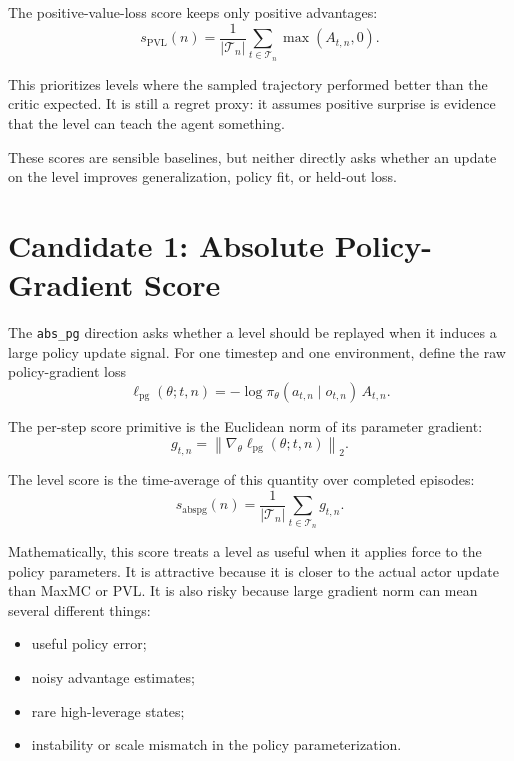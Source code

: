 \documentclass[11pt]{article}
\begin{document}
The positive-value-loss score keeps only positive advantages:
\begin{equation}
  s_{\mathrm{PVL}}(n)
    = \frac{1}{|\mathcal{T}_n|}
      \sum_{t \in \mathcal{T}_n}
      \max(A_{t,n}, 0).
\end{equation}

This prioritizes levels where the sampled trajectory performed better than the
critic expected. It is still a regret proxy: it assumes positive surprise is
evidence that the level can teach the agent something.

These scores are sensible baselines, but neither directly asks whether an
update on the level improves generalization, policy fit, or held-out loss.

\section{Candidate 1: Absolute Policy-Gradient Score}

The \texttt{abs\_pg} direction asks whether a level should be replayed when it induces
a large policy update signal. For one timestep and one environment, define the
raw policy-gradient loss
\begin{equation}
  \ell_{\mathrm{pg}}(\theta; t,n)
    = -\log \pi_\theta(a_{t,n} \mid o_{t,n})\, A_{t,n}.
\end{equation}

The per-step score primitive is the Euclidean norm of its parameter gradient:
\begin{equation}
  g_{t,n}
    = \left\lVert \nabla_\theta \ell_{\mathrm{pg}}(\theta; t,n) \right\rVert_2.
\end{equation}

The level score is the time-average of this quantity over completed episodes:
\begin{equation}
  s_{\mathrm{abspg}}(n)
    = \frac{1}{|\mathcal{T}_n|}
      \sum_{t \in \mathcal{T}_n} g_{t,n}.
\end{equation}

Mathematically, this score treats a level as useful when it applies force to
the policy parameters. It is attractive because it is closer to the actual
actor update than MaxMC or PVL. It is also risky because large gradient norm can
mean several different things:
\begin{itemize}[leftmargin=*]
  \item useful policy error;
  \item noisy advantage estimates;
  \item rare high-leverage states;
  \item instability or scale mismatch in the policy parameterization.
\end{itemize}
\end{document}
